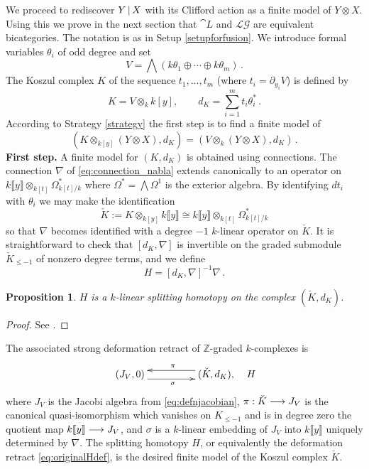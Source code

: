 \documentclass[english,letter paper,12pt,leqno]{article}
\newtheorem{proposition}[theorem]{Proposition}
\theoremstyle{example}
\numberwithin{equation}{section}
\def\LG{\mathcal{LG}}
\begin{document}
We proceed to rediscover $Y \,|\, X$ with its Clifford action as a finite model of $Y \otimes X$. Using this we prove in the next section that $\cat{L}$ and $\LG$ are equivalent bicategories. The notation is as in Setup \ref{setupforfusion}. We introduce formal variables $\theta_i$ of odd degree and set
\[
V = \bigwedge\left( k \theta_1 \oplus \cdots \oplus k \theta_m \right)\,.
\]
The Koszul complex $K$ of the sequence $t_1,\ldots,t_m$ (where $t_i = \partial_{y_i} V$) is defined by
\begin{equation}\label{defn:koszul}
K = V \otimes_k k[y], \qquad d_K = \sum_{i=1}^m t_i \theta_i^*\,.
\end{equation}
According to Strategy \ref{strategy} the first step is to find a finite model of
\[
( K \otimes_{k[y]} ( Y \otimes X ), d_K ) = ( V \otimes_k ( Y \otimes X ), d_K )\,.
\]
\textbf{First step.} A finite model for $(K, d_K)$ is obtained using connections. The connection $\nabla$ of \eqref{eq:connection_nabla} extends canonically to an operator on $k\llbracket y \rrbracket \otimes_{k[t]} \Omega^*_{k[t]/k}$ where $\Omega^* = \bigwedge \Omega^1$ is the exterior algebra. By identifying $d t_i$ with $\theta_i$ we may make the identification
\[
\check{K} := K \otimes_{k[y]} k\llbracket y \rrbracket \cong k\llbracket y \rrbracket \otimes_{k[t]} \Omega^*_{k[t]/k}
\]
so that $\nabla$ becomes identified with a degree $-1$ $k$-linear operator on $\check{K}$.  It is straightforward to check that $[d_K, \nabla]$ is invertible on the graded submodule $\check{K}_{\le -1}$ of nonzero degree terms, and we define
\[
H = [d_K, \nabla]^{-1} \nabla\,.
\]

\begin{proposition} $H$ is a $k$-linear splitting homotopy on the complex $(\check{K},d_K)$.
\end{proposition}
\begin{proof}
See \cite[Section 8.1]{dm1102.2957}.
\end{proof}

The associated strong deformation retract of $\mathbb{Z}$-graded $k$-complexes is
\begin{equation}\label{eq:originalHdef}
\xymatrix@C+2pc{
(J_V,0) \ar@<-1ex>[r]_{\sigma} & (\check{K}, d_K), \ar@<-1ex>[l]_{\pi}
} \quad H
\end{equation}
where $J_V$ is the Jacobi algebra from \eqref{eq:defnjacobian}, $\pi: \check{K} \longrightarrow J_V$ is the canonical quasi-isomorphism which vanishes on $K_{\le -1}$ and is in degree zero the quotient map $k\llbracket y \rrbracket \longrightarrow J_V$, and $\sigma$ is a $k$-linear embedding of $J_V$ into $k\llbracket y \rrbracket$ uniquely determined by $\nabla$. The splitting homotopy $H$, or equivalently the deformation retract \eqref{eq:originalHdef}, is the desired finite model of the Koszul complex $\check{K}$.
\end{document}
